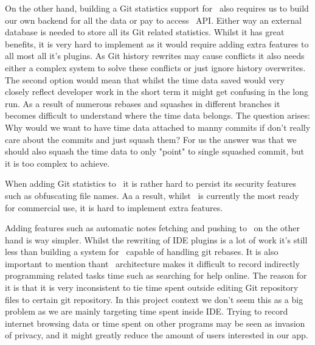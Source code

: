 On the other hand, building a Git statistics support for~ also requires us to build our own backend
for all the data or pay to access~ API.
Either way an external database is needed to store all its Git related statistics.
Whilst it has great benefits, it is very hard to implement as it would require adding extra features to all most all it's plugins.
As Git history rewrites may cause conflicts it also needs either a complex system to solve these conflicts or just ignore history overwrites.
The second option would mean that whilst the time data saved would very closely reflect developer work in the short term it might get
confusing in the long run.
As a result of numerous rebases and squashes in different branches it becomes difficult to understand where the time data belongs.
The question arises: Why would we want to have time data attached to manny commits if don't really care about the commits and just squash them?
For us the answer was that we should also squash the time data to only "point" to single squashed commit, but it is too complex to achieve.

When adding Git statistics to~ it is rather hard to persist its security features such as obfuscating file names.
Aa a result, whilst~ is currently the most ready for commercial use, it is hard to implement extra features.

Adding features such as automatic notes fetching and pushing to~ on the other hand is way simpler.
Whilst the rewriting of IDE plugins is a lot of work it's still less than building a system for~ capable of handling git rebases.
It is also important to mention thant~ architecture makes it difficult to record indirectly programming related tasks time
such as searching for help online.
The reason for it is that it is very inconsistent to tie time spent outside editing Git repository files to certain git repository.
In this project context we don't seem this as a big problem as we are mainly targeting time spent inside IDE.
Trying to record internet browsing data or time spent on other programs may be seen as invasion of privacy,
and it might greatly reduce the amount of users interested in our app.